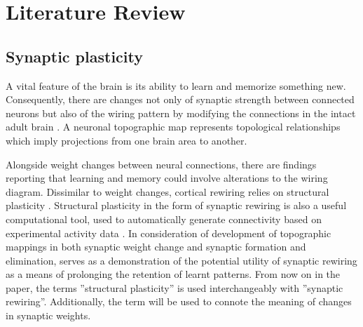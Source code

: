 \documentclass[letterpaper, 10 pt, conference]{ieeeconf}  %
\begin{document}



\section{Literature Review}

\subsection{Synaptic plasticity}

A vital feature of the brain is its ability to learn and memorize something new. 
Consequently, there are changes not only of synaptic strength between connected neurons but also of the wiring pattern by modifying the connections in the intact adult brain \cite{albieri2015rapid}.
A neuronal topographic map represents topological relationships which imply projections from one brain area to another.

Alongside weight changes between neural connections, there are findings reporting that learning and memory  could involve alterations to the wiring diagram.
Dissimilar to weight changes, cortical rewiring relies on structural plasticity \cite{Chklovskii2004b}.
Structural plasticity in the form of synaptic rewiring is also a useful computational tool, used to automatically generate connectivity based on experimental activity data \cite{Diaz-Pier2016a}.
In consideration of development of topographic mappings in both synaptic weight change and synaptic formation and elimination, \cite{bamford2010synaptic} serves as a demonstration of the potential utility of synaptic rewiring as a means of prolonging the retention of learnt patterns.
From now on in the paper, the terms ''structural plasticity'' is used interchangeably with ''synaptic rewiring''.
Additionally, the term will be used to connote the meaning of changes in synaptic weights.
\end{document}
